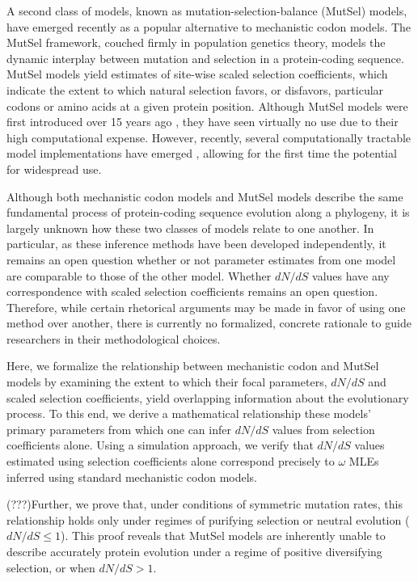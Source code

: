\documentclass[11pt]{article}
\begin{document}
A second class of models, known as mutation-selection-balance (MutSel) models, have emerged recently as a popular alternative to mechanistic codon models. The MutSel framework, couched firmly in population genetics theory, models the dynamic interplay between mutation and selection in a protein-coding sequence. MutSel models yield estimates of site-wise scaled selection coefficients, which indicate the extent to which natural selection favors, or disfavors, particular codons or amino acids at a given protein position. Although MutSel models were first introduced over 15 years ago \cite{HalpernBruno1998}, they have seen virtually no use due to their high computational expense. However, recently, several computationally tractable model implementations have emerged \cite{RodrigueLartillot2014,Tamurietal2014}, allowing for the first time the potential for widespread use. 


Although both mechanistic codon models and MutSel models describe the same fundamental process of protein-coding sequence evolution along a phylogeny, it is largely unknown how these two classes of models relate to one another. In particular, as these inference methods have been developed independently, it remains an open question whether or not parameter estimates from one model are comparable to those of the other model. Whether $dN/dS$ values have any correspondence with scaled selection coefficients remains an open question. Therefore, while certain rhetorical arguments may be made in favor of using one method over another, there is currently no formalized, concrete rationale to guide researchers in their methodological choices. 

Here, we formalize the relationship between mechanistic codon and MutSel models by examining the extent to which their focal parameters, $dN/dS$ and scaled selection coefficients, yield overlapping information about the evolutionary process. To this end, we derive a mathematical relationship these models' primary parameters from which one can infer $dN/dS$ values from selection coefficients alone. Using a simulation approach, we verify that $dN/dS$ values estimated using selection coefficients alone correspond precisely to $\omega$ MLEs inferred using standard mechanistic codon models. 

(???)Further, we prove that, under conditions of symmetric mutation rates, this relationship holds only under regimes of purifying selection or neutral evolution ($dN/dS \leq 1$). This proof reveals that MutSel models are inherently unable to describe accurately protein evolution under a regime of positive diversifying selection, or when $dN/dS > 1$.
\end{document}
